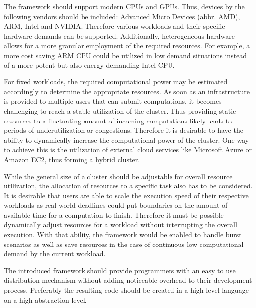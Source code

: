 \begin{description}[style=nextline]
    \item [Heterogeneity]
    The framework should support modern CPUs and GPUs. Thus, devices by the following vendors should be included: Advanced Micro Devices (abbr. AMD), ARM, Intel and NVIDIA. Therefore various workloads and their specific hardware demands can be supported. Additionally, heterogeneous hardware allows for a more granular employment of the required resources. For example, a more cost saving ARM CPU could be utilized in low demand situations instead of a more potent but also energy demanding Intel CPU.

    \item [Resource Scalability]
    For fixed workloads, the required computational power may be estimated accordingly to determine the appropriate resources. As soon as an infrastructure is provided to multiple users that can submit computations, it becomes challenging to reach a stable utilization of the cluster. Thus providing static resources to a fluctuating amount of incoming computations likely leads to periods of underutilization or congestions. Therefore it is desirable to have the ability to dynamically increase the computational power of the cluster. One way to achieve this is the utilization of external cloud services like Microsoft Azure or Amazon EC2, thus forming a hybrid cluster.

    \item [Scalable Speed]
    While the general size of a cluster should be adjustable for overall resource utilization, the allocation of resources to a specific task also has to be considered. It is desirable that users are able to scale the execution speed of their respective workloads as real-world deadlines could put boundaries on the amount of available time for a computation to finish. Therefore it must be possible dynamically adjust resources for a workload without interrupting the overall execution. With that ability, the framework would be enabled to handle burst scenarios as well as save resources in the case of continuous low computational demand by the current workload.

    \item [Ease of Programming]
    The introduced framework should provide programmers with an easy to use distribution mechanism without adding noticeable overhead to their development process. Preferably the resulting code should be created in a high-level language on a high abstraction level.


\end{description}
